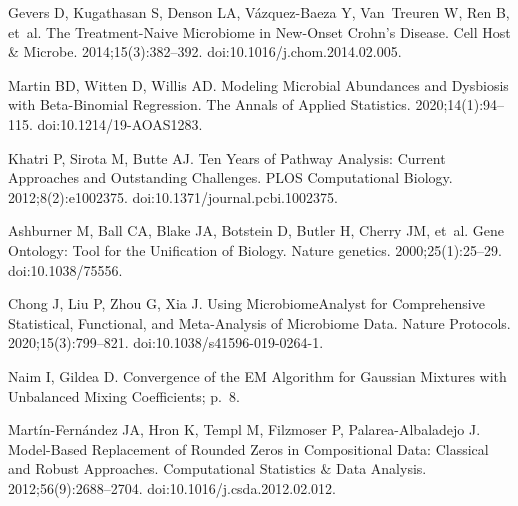 \documentclass[10pt,letterpaper]{article}
\begin{document}
\begin{thebibliography}{10}
    Gevers D, Kugathasan S, Denson LA, {V{\'a}zquez-Baeza} Y, Van~Treuren W, Ren B,
      et~al.
    \newblock The {{Treatment}}-{{Naive Microbiome}} in {{New}}-{{Onset Crohn}}'s
      {{Disease}}.
    \newblock Cell Host \& Microbe. 2014;15(3):382--392.
    \newblock doi:{10.1016/j.chom.2014.02.005}.
    
    Martin BD, Witten D, Willis AD.
    \newblock Modeling Microbial Abundances and Dysbiosis with Beta-Binomial
      Regression.
    \newblock The Annals of Applied Statistics. 2020;14(1):94--115.
    \newblock doi:{10.1214/19-AOAS1283}.
    
    Khatri P, Sirota M, Butte AJ.
    \newblock Ten {{Years}} of {{Pathway Analysis}}: {{Current Approaches}} and
      {{Outstanding Challenges}}.
    \newblock PLOS Computational Biology. 2012;8(2):e1002375.
    \newblock doi:{10.1371/journal.pcbi.1002375}.
    
    Ashburner M, Ball CA, Blake JA, Botstein D, Butler H, Cherry JM, et~al.
    \newblock Gene {{Ontology}}: Tool for the Unification of Biology.
    \newblock Nature genetics. 2000;25(1):25--29.
    \newblock doi:{10.1038/75556}.
    
    Chong J, Liu P, Zhou G, Xia J.
    \newblock Using {{MicrobiomeAnalyst}} for Comprehensive Statistical,
      Functional, and Meta-Analysis of Microbiome Data.
    \newblock Nature Protocols. 2020;15(3):799--821.
    \newblock doi:{10.1038/s41596-019-0264-1}.
    
    Naim I, Gildea D.
    \newblock Convergence of the {{EM Algorithm}} for {{Gaussian Mixtures}} with
      {{Unbalanced Mixing Coefficients}}; p.~8.
    
    {Mart{\'i}n-Fern{\'a}ndez} JA, Hron K, Templ M, Filzmoser P,
      {Palarea-Albaladejo} J.
    \newblock Model-Based Replacement of Rounded Zeros in Compositional Data:
      {{Classical}} and Robust Approaches.
    \newblock Computational Statistics \& Data Analysis. 2012;56(9):2688--2704.
    \newblock doi:{10.1016/j.csda.2012.02.012}.
    
    \end{thebibliography}
    
\end{document}
